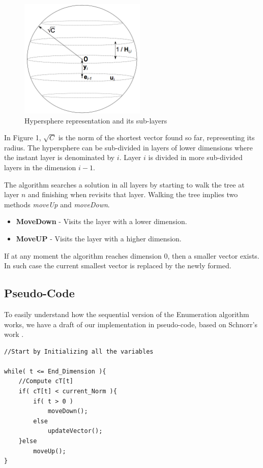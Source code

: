 \documentclass[conference]{IEEEtran}
\begin{document}
\begin{figure}[ht!]
\centering
\includegraphics[width=60mm]{imgSequential/hypersphere.png}
\caption{Hypersphere representation and its sub-layers}
\end{figure}

    In Figure 1, $\sqrt C$ is the norm of the shortest vector found so far, representing its radius. The hypersphere can be sub-divided in layers of lower dimensions where the instant layer is denominated by $i$. Layer $i$ is divided in more sub-divided layers in the dimension $i-1$. 
    
    The algorithm searches a solution in all layers by starting to walk the tree at layer $n$ and finishing when revisits that layer. Walking the tree implies two methods \emph{moveUp} and \emph{moveDown}.

\begin{itemize}
\item \textbf{MoveDown} - Visits the layer with a lower dimension.
\item \textbf{MoveUP} - Visits the layer with a higher dimension.
\end{itemize}

If at any moment the algorithm reaches dimension 0, then a smaller vector exists. In such case the current smallest vector is replaced by the newly formed.

\subsection{Pseudo-Code}
To easily understand how the sequential version of the Enumeration algorithm works, we have a draft of our implementation in pseudo-code, based on Schnorr's work \cite{schnorr}.


\begin{lstlisting}[caption=Enumeration Pseudo-Code]
//Start by Initializing all the variables

while( t <= End_Dimension ){
    //Compute cT[t]
    if( cT[t] < current_Norm ){
        if( t > 0 )
            moveDown();
        else
            updateVector();
    }else
        moveUp();
}
\end{lstlisting}
\end{document}
